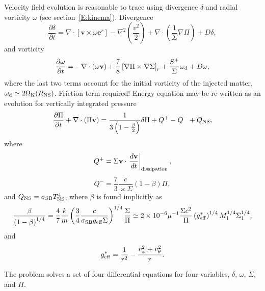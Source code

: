 \documentclass[usenatbib,onecolumn]{mnras}
\newcommand{\alert}[1]{\color{red} #1\color{black}}
\renewcommand{\vector}[1]{\ensuremath{\mathbf{#1}}}
\newcommand{\pardir}[2]{\ensuremath{\frac{\partial #2}{\partial #1} }}
\begin{document}
Velocity field evolution is reasonable to trace using divergence $\delta$ and
radial vorticity $\omega$ (see section~\ref{E:kinema}). Divergence
\begin{equation}\label{E:set:div}
\pardir{t}{\delta} = \nabla \cdot [\vector{v} \times  \omega \vector{e}^r] -
\nabla^2 \left(\frac{v^2}{2}\right) + \nabla \cdot \left( \frac{1}{\Sigma}
\nabla \Pi \right) + D\delta,
\end{equation}
and vorticity
\begin{equation}\label{E:set:vort}
\pardir{t}{\omega} = -\nabla \cdot (\omega \vector{v}) +
\frac{7}{8}\left[\nabla \Pi \times \nabla \Sigma \right]_r +
\frac{S^+}{\Sigma} \omega_{\rm d} + D\omega,
\end{equation}
where the last two terms account for the initial vorticity of the injected
matter, $\omega_{\rm d} \simeq 2\Omega_{\rm K}(R_{\rm NS})$. \alert{Friction
  term required!}
Energy equation may be re-written as an evolution for vertically integrated
pressure
\begin{equation}\label{E:set:press}
\pardir{t}{\Pi} + \nabla \cdot \left( \Pi \vector{v}\right) = \frac{1}{3\left(
  1-\frac{\beta}{2}\right)} \delta \Pi + Q^+ - Q^- + Q_{\rm NS},
\end{equation}
where 
\begin{equation}\label{E:set:qplus}
Q^+ = \Sigma \vector{v} \cdot \left.\frac{d\vector{v}}{dt}\right|_{\rm dissipation},
\end{equation}
\begin{equation}\label{E:set:qminus}
Q^- = \frac{7}{3} \frac{c}{\varkappa \Sigma}(1-\beta) \Pi,
\end{equation}
and $Q_{\rm NS} =  \sigma_{\rm SB} T_{\rm NS}^4$, where $\beta$ is found
implicitly as
\begin{equation}\label{E:set:beta}
\frac{\beta}{\left(1-\beta\right)^{1/4}} = \frac{4}{7} \frac{k}{m}
\left(\frac{3}{4}\frac{c}{\sigma_{\rm SB} g_{\rm eff} \Sigma} \right)^{1/4}
\frac{\Sigma}{\Pi} \simeq 2\times 10^{-6} \mu^{-1} \frac{\Sigma c^2}{\Pi}
\left(g_{\rm eff}^*\right)^{1/4} M_1^{1/4} \Sigma_1^{1/4},
\end{equation}
and 
\begin{equation}\label{E:set:gravity}
g_{\rm eff}^* = \frac{1}{r^2} - \frac{v_\varphi^2 + v_\theta^2}{r}.
\end{equation}

The problem solves a set of four differential equations for four variables,
$\delta$, $\omega$, $\Sigma$, and $\Pi$.
\end{document}
